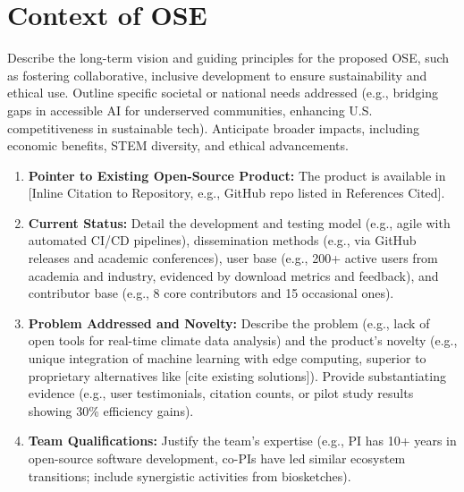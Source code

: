 \documentclass[11pt]{article}
\begin{document}
\section*{Context of OSE}
\vspace{-3pt}
\noindent
Describe the long-term vision and guiding principles for the proposed OSE, such as fostering collaborative, inclusive development to ensure sustainability and ethical use. Outline specific societal or national needs addressed (e.g., bridging gaps in accessible AI for underserved communities, enhancing U.S. competitiveness in sustainable tech). Anticipate broader impacts, including economic benefits, STEM diversity, and ethical advancements.
\begin{enumerate}
    \item \textbf{Pointer to Existing Open-Source Product:} The product is available in [Inline Citation to Repository, e.g., GitHub repo listed in References Cited].
    \item \textbf{Current Status:} Detail the development and testing model (e.g., agile with automated CI/CD pipelines), dissemination methods (e.g., via GitHub releases and academic conferences), user base (e.g., 200+ active users from academia and industry, evidenced by download metrics and feedback), and contributor base (e.g., 8 core contributors and 15 occasional ones).
    \item \textbf{Problem Addressed and Novelty:} Describe the problem (e.g., lack of open tools for real-time climate data analysis) and the product's novelty (e.g., unique integration of machine learning with edge computing, superior to proprietary alternatives like [cite existing solutions]). Provide substantiating evidence (e.g., user testimonials, citation counts, or pilot study results showing 30\% efficiency gains).
    \item \textbf{Team Qualifications:} Justify the team's expertise (e.g., PI has 10+ years in open-source software development, co-PIs have led similar ecosystem transitions; include synergistic activities from biosketches).
\end{enumerate}
\end{document}

